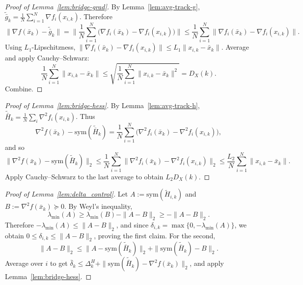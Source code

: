 \documentclass[11pt,a4paper]{article}
\begin{document}
\begin{proof}[Proof of Lemma~\ref{lem:bridge-grad}]
By Lemma~\ref{lem:avg-track-g}, $\tilde{\bar g}_k=\frac1N\sum_{i=1}^N\nabla f_i(x_{i,k})$.
Therefore
\[
\|\nabla f(\bar x_k)-\tilde{\bar g}_k\|
=\Big\|\frac1N\sum_{i=1}^N\big(\nabla f_i(\bar x_k)-\nabla f_i(x_{i,k})\big)\Big\|
\le \frac1N\sum_{i=1}^N \|\nabla f_i(\bar x_k)-\nabla f_i(x_{i,k})\|.
\]
Using $L_1$-Lipschitzness, $\|\nabla f_i(\bar x_k)-\nabla f_i(x_{i,k})\|\le L_1\|x_{i,k}-\bar x_k\|$.
Average and apply Cauchy--Schwarz:
\[
\frac1N\sum_{i=1}^N\|x_{i,k}-\bar x_k\|
\le \sqrt{\frac1N\sum_{i=1}^N\|x_{i,k}-\bar x_k\|^2}=D_X(k).
\]
Combine.
\end{proof}

\begin{proof}[Proof of Lemma~\ref{lem:bridge-hess}]
By Lemma~\ref{lem:avg-track-h}, $\tilde{\bar H}_k=\frac1N\sum_i \nabla^2 f_i(x_{i,k})$.
Thus
\[
\nabla^2 f(\bar x_k)-\mathrm{sym}(\tilde{\bar H}_k)
=\frac1N\sum_{i=1}^N\big(\nabla^2 f_i(\bar x_k)-\nabla^2 f_i(x_{i,k})\big),
\]
and so
\[
\|\nabla^2 f(\bar x_k)-\mathrm{sym}(\tilde{\bar H}_k)\|_2
\le \frac1N\sum_{i=1}^N\|\nabla^2 f_i(\bar x_k)-\nabla^2 f_i(x_{i,k})\|_2
\le \frac{L_2}{N}\sum_{i=1}^N\|x_{i,k}-\bar x_k\|.
\]
Apply Cauchy--Schwarz to the last average to obtain $L_2 D_X(k)$.
\end{proof}

\begin{proof}[Proof of Lemma~\ref{lem:delta_control}]
Let $A:=\mathrm{sym}(\tilde H_{i,k})$ and $B:=\nabla^2 f(\bar x_k)\succeq0$.
By Weyl's inequality,
\[
\lambda_{\min}(A)\ge \lambda_{\min}(B)-\|A-B\|_2\ge -\|A-B\|_2.
\]
Therefore $-\lambda_{\min}(A)\le \|A-B\|_2$, and since $\delta_{i,k}=\max\{0,-\lambda_{\min}(A)\}$,
we obtain $0\le \delta_{i,k}\le \|A-B\|_2$, proving the first claim.
For the second,
\[
\|A-B\|_2\le \|A-\mathrm{sym}(\tilde{\bar H}_k)\|_2+\|\mathrm{sym}(\tilde{\bar H}_k)-B\|_2.
\]
Average over $i$ to get $\bar\delta_k\le \Delta_k^H+\|\mathrm{sym}(\tilde{\bar H}_k)-\nabla^2 f(\bar x_k)\|_2$,
and apply Lemma~\ref{lem:bridge-hess}.
\end{proof}
\end{document}
